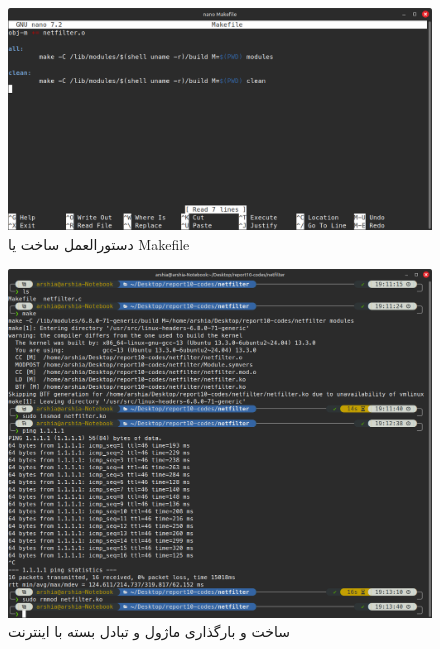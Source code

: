 \documentclass[12pt]{article}
\begin{document}
	\begin{figure}[H]
		\centering
		\includegraphics[width=\textwidth]{report10-resources/screenshots/5.png}
		\caption{دستورالعمل ساخت یا \textenglish{Makefile}}
		\label{img:5}
	\end{figure}
	\begin{figure}[H]
		\centering
		\includegraphics[width=\textwidth]{report10-resources/screenshots/6.png}
		\caption{ساخت و بارگذاری ماژول و تبادل بسته با اینترنت}
		\label{img:6}
	\end{figure}
\end{document}
